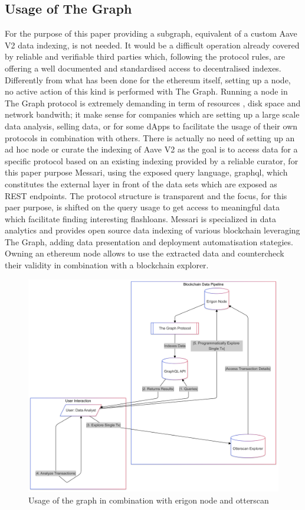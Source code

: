 \documentclass[11pt,a4paper,titlepage]{scrartcl}
\begin{document}
\subsection{Usage of The Graph}
For the purpose of this paper  providing a subgraph, equivalent of a custom Aave V2 data indexing, is not needed. It would be a difficult operation already covered by reliable and verifiable third parties which, following the protocol rules, are offering a well documented and standardised access to decentralised indexes. Differently from what has been done  for the ethereum itself, setting up a node, no active action of this kind is performed with The Graph. Running a node in The Graph protocol is extremely demanding in term of resources , disk space and network bandwith; it make sense for companies which are setting up a large scale data analysis, selling data, or for some dApps to facilitate the usage of their own protocols in combination with others.  There is actually no need of setting up an ad hoc node or curate the indexing of Aave V2 as the goal is to access data for a specific protocol based on an existing indexing  provided by a reliable curator, for this paper purpose Messari, using the exposed query language, graphql, which constitutes the external layer in front of the data sets which are exposed as REST endpoints. The protocol structure is  transparent and the focus, for this paer purpose, is shifted on the query  usage to get access to meaningful data which facilitate finding interesting flashloans. Messari is specialized in data analytics and provides open source data indexing of various blockchain leveraging The Graph, adding data presentation and deployment automatisation stategies. 
Owning an ethereum node allows to use the extracted data and countercheck their validity in combination with a blockchain explorer.

\begin{figure}[ht]
    \includegraphics[width=1.0\textwidth]{image/thegraph/process.png}
    \caption{Usage of the graph in combination with erigon node and otterscan}
    \label{fig:processthegraph}
\end{figure}
\end{document}
